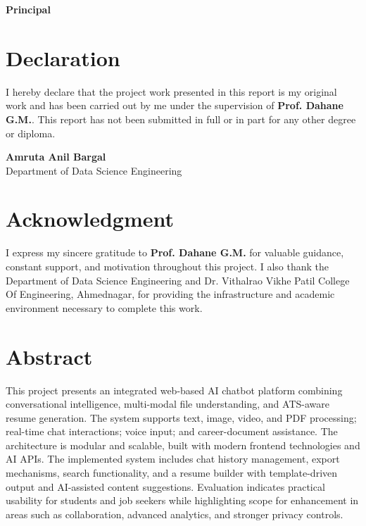 \documentclass[12pt,a4paper]{report}
\begin{document}
\vspace{0.8in}
\noindent\textbf{Principal}

\chapter*{Declaration}
I hereby declare that the project work presented in this report is my original work and has been carried out by me under the supervision of \textbf{Prof. Dahane G.M.}. This report has not been submitted in full or in part for any other degree or diploma.

\vspace{1in}
\noindent
\textbf{Amruta Anil Bargal}\\
Department of Data Science Engineering

\chapter*{Acknowledgment}
I express my sincere gratitude to \textbf{Prof. Dahane G.M.} for valuable guidance, constant support, and motivation throughout this project. I also thank the Department of Data Science Engineering and Dr. Vithalrao Vikhe Patil College Of Engineering, Ahmednagar, for providing the infrastructure and academic environment necessary to complete this work.

\chapter*{Abstract}
This project presents an integrated web-based AI chatbot platform combining conversational intelligence, multi-modal file understanding, and ATS-aware resume generation. The system supports text, image, video, and PDF processing; real-time chat interactions; voice input; and career-document assistance. The architecture is modular and scalable, built with modern frontend technologies and AI APIs. The implemented system includes chat history management, export mechanisms, search functionality, and a resume builder with template-driven output and AI-assisted content suggestions. Evaluation indicates practical usability for students and job seekers while highlighting scope for enhancement in areas such as collaboration, advanced analytics, and stronger privacy controls.
\end{document}
